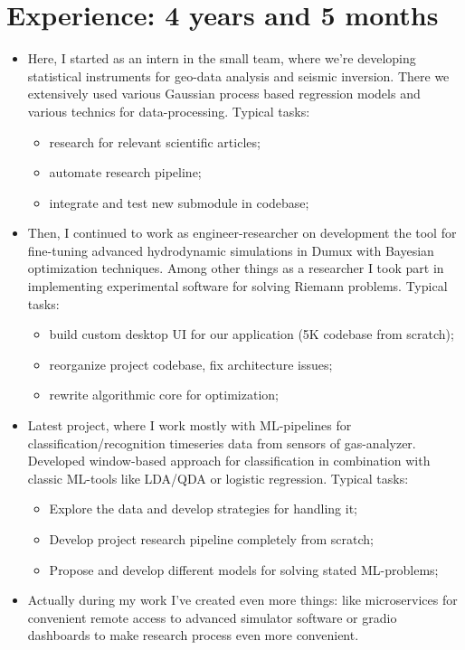 \documentclass[12pt,a4paper,roman]{moderncv}
\begin{document}
\section{Experience: 4 years and 5 months}
\begin{itemize}
\item Here, I started as an intern in the small team, where we're developing statistical instruments for geo-data analysis and seismic inversion. 
There we extensively used various Gaussian process based regression models and various technics for data-processing. \newline \newline
Typical tasks: 
 \begin{itemize}
  \item research for relevant scientific articles;
  \item automate research pipeline;
  \item integrate and test new submodule in codebase; \newline
 \end{itemize}
\item Then, I continued to work as engineer-researcher on development the tool for fine-tuning advanced 
hydrodynamic simulations in Dumux with Bayesian optimization techniques.  
Among other things as a researcher I took part in implementing experimental software for solving Riemann problems. \newline \newline
Typical tasks: 
 \begin{itemize}
  \item build custom desktop UI for our application (5K codebase from scratch);
  \item reorganize project codebase, fix architecture issues;
  \item rewrite algorithmic core for optimization; \newline
 \end{itemize}
\item Latest project, where I work mostly with ML-pipelines for classification/recognition timeseries data from sensors of gas-analyzer.
Developed window-based approach for classification in combination with classic ML-tools like LDA/QDA or logistic regression. \newline \newline
Typical tasks: 
 \begin{itemize}
  \item Explore the data and develop strategies for handling it;
  \item Develop project research pipeline completely from scratch;
  \item Propose and develop different models for solving stated ML-problems; \newline
 \end{itemize}
\item Actually during my work I've created even more things: like microservices for convenient remote access to advanced simulator software
or gradio dashboards to make research process even more convenient. \newline
\end{itemize}
\end{document}
